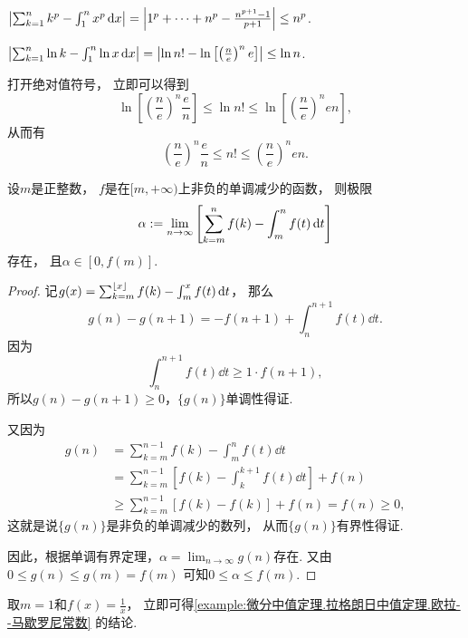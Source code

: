 \begin{example}
\(\abs{\sum_{k=1}^n k^p - \int_1^n x^p \dd{x}}
= \abs{1^p+\dotsb+n^p - \frac{n^{p+1}-1}{p+1}}
\leq n^p\).
\end{example}

\begin{example}
\(\abs{\sum_{k=1}^n \ln k - \int_1^n \ln x \dd{x}}
= \abs{\ln n! - \ln\left[\left(\frac{n}{e}\right)^n e\right]}
\leq \ln n\).
\end{example}
\begin{remark}
打开绝对值符号，
立即可以得到\[
	\ln\left[\left(\frac{n}{e}\right)^n \frac{e}{n}\right]
	\leq \ln n!
	\leq \ln\left[\left(\frac{n}{e}\right)^n e n\right],
\]
从而有\[
	\left(\frac{n}{e}\right)^n \frac{e}{n}
	\leq n!
	\leq \left(\frac{n}{e}\right)^n e n.
\]
\end{remark}

\begin{theorem}
设\(m\)是正整数，
\(f\)是在\([m,+\infty)\)上非负的单调减少的函数，
则极限\[
	\alpha
	:=
	\lim_{n\to\infty} \left[
		\sum_{k=m}^n f(k)
		- \int_m^n f(t) \dd{t}
	\right]
\]存在，
且\(\alpha\in[0,f(m)]\).
\begin{proof}
记\(g(x)
= \sum_{k=m}^{\lfloor x\rfloor} f(k)
- \int_m^x f(t) \dd{t}\)，
那么\[
	g(n) - g(n+1)
	= -f(n+1)
	+ \int_n^{n+1} f(t) \dd{t}.
\]
因为\[
	\int_n^{n+1} f(t) \dd{t}
	\geq
	1 \cdot f(n+1),
\]
所以\(g(n) - g(n+1) \geq 0\)，\(\{g(n)\}\)单调性得证.

又因为\begin{align*}
	g(n)
	&= \sum_{k=m}^{n-1} f(k) - \int_m^n f(t) \dd{t} \\
	&= \sum_{k=m}^{n-1} \left[
			f(k) - \int_k^{k+1} f(t) \dd{t}
		\right] + f(n) \\
	&\geq \sum_{k=m}^{n-1} [f(k) - f(k)] + f(n)
	= f(n) \geq 0,
\end{align*}
这就是说\(\{g(n)\}\)是非负的单调减少的数列，
从而\(\{g(n)\}\)有界性得证.

因此，根据单调有界定理，\(\alpha = \lim_{n\to\infty} g(n)\)存在.
又由\(0 \leq g(n) \leq g(m) = f(m)\)
可知\(0 \leq \alpha \leq f(m)\).
\end{proof}
\end{theorem}
\begin{remark}
取\(m=1\)和\(f(x) = \frac1x\)，
立即可得\cref{example:微分中值定理.拉格朗日中值定理.欧拉--马歇罗尼常数} 的结论.
\end{remark}

